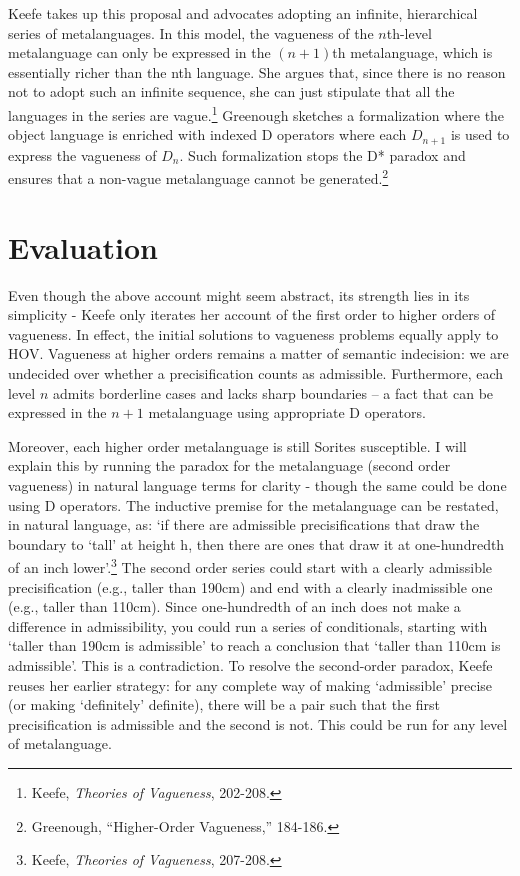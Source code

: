 Keefe takes up this proposal and advocates adopting an infinite,
hierarchical series of metalanguages. In this model, the vagueness of
the $n$th-level metalanguage can only be expressed in the $(n+1)$th
metalanguage, which is essentially richer than the nth language. She
argues that, since there is no reason not to adopt such an infinite
sequence, she can just stipulate that all the languages in the series
are vague.\footnote{Keefe, \emph{Theories of Vagueness}, 202-208.}
Greenough sketches a formalization where the object language is enriched
with indexed D operators where each \(D_{n + 1}\) is used to express the
vagueness of \(D_{n}\). Such formalization stops the D* paradox and
ensures that a non-vague metalanguage cannot be generated.\footnote{Greenough,
  ``Higher-Order Vagueness,'' 184-186.}

\section{Evaluation}

Even though the above account might seem abstract, its strength lies in
its simplicity - Keefe only iterates her account of the first order to
higher orders of vagueness. In effect, the initial solutions to
vagueness problems equally apply to HOV. Vagueness at higher orders
remains a matter of semantic indecision: we are undecided over whether a
precisification counts as admissible. Furthermore, each level $n$
admits borderline cases and lacks sharp boundaries -- a fact that can be
expressed in the $n+1$ metalanguage using appropriate D operators.

Moreover, each higher order metalanguage is still Sorites susceptible. I
will explain this by running the paradox for the metalanguage (second
order vagueness) in natural language terms for clarity - though the same
could be done using D operators. The inductive premise for the
metalanguage can be restated, in natural language, as: `if there are
admissible precisifications that draw the boundary to `tall' at height
h, then there are ones that draw it at one-hundredth of an inch
lower'.\footnote{Keefe, \emph{Theories of Vagueness}, 207-208.} The
second order series could start with a clearly admissible
precisification (e.g., taller than 190cm) and end with a clearly
inadmissible one (e.g., taller than 110cm). Since one-hundredth of an
inch does not make a difference in admissibility, you could run a series
of conditionals, starting with `taller than 190cm is admissible' to
reach a conclusion that `taller than 110cm is admissible'. This is a
contradiction. To resolve the second-order paradox, Keefe reuses her
earlier strategy: for any complete way of making `admissible' precise
(or making `definitely' definite), there will be a pair such that the
first precisification is admissible and the second is not. This could be
run for any level of metalanguage.


